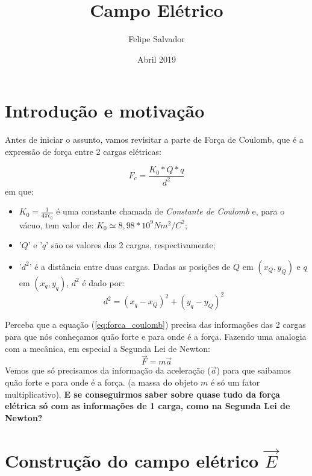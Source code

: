 \documentclass[12pt]{extarticle}
\title{Campo Elétrico}
\author{Felipe Salvador }
\date{Abril 2019}
\newcommand{\<}{\langle}
\renewcommand{\>}{\rangle}
\theoremstyle{definition}
\begin{document}
\maketitle

\section{Introdução e motivação}


Antes de iniciar o assunto, vamos revisitar a parte de Força de Coulomb, que é a expressão de força entre 2 cargas elétricas:

\begin{equation} \label{eq:forca_coulomb}
    F_{c} = \frac{K_{0}*Q*q}{d^{2}}
\end{equation}
em que:
\begin{itemize}
    \item 
$K_{0} = \frac{1}{4\pi\epsilon_{0}}$ é uma constante chamada de \textit{Constante de Coulomb} e, para o vácuo, tem valor de: $K_{0} \simeq 8,98*10^{9} Nm^{2}/C^{2}$; 

\item
'$Q$' e '$q$' são os valores das 2 cargas, respectivamente;

\item
'$d^{2}$' é a distância entre duas cargas. Dadas as posições de $Q$ em $(x_{Q},y_{Q})$ e $q$ em $(x_{q},y_{q})$, $d^{2}$ é dado por:
\begin{equation} \label{eq:distancia}
    d^{2} = (x_{q} - x_{Q})^{2} + (y_{q} - y_{Q})^{2} 
\end{equation}

\end{itemize}
 
 Perceba que a equação (\ref{eq:forca_coulomb}) precisa das informações das 2 cargas para que nós conheçamos quão forte e para onde é a força. Fazendo uma analogia com a mecânica, em especial a Segunda Lei de Newton:
 \begin{equation} \label{eq:newton}
     \vec{F} = m\vec{a}
 \end{equation}
 Vemos que só precisamos da informação da aceleração ($\vec{a}$) para que saibamos quão forte e para onde é a força. (a massa do objeto $m$ é só um fator multiplicativo). \textbf{E se conseguirmos saber sobre quase tudo da força elétrica só com as informações de 1 carga, como na Segunda Lei de Newton?}
 
 \section{Construção do campo elétrico $\vec{E}$}
 
\end{document}
